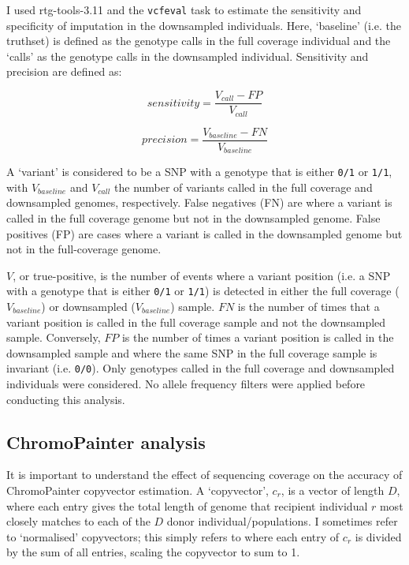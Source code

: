 {I used rtg-tools-3.11 \cite{cleary2014joint} and the \texttt{vcfeval} task to estimate the sensitivity and specificity of imputation in the downsampled individuals. Here, `baseline' (i.e. the truthset) is defined as the genotype calls in the full coverage individual and the `calls' as the genotype calls in the downsampled individual. Sensitivity and precision are defined as: 

\begin{equation}
sensitivity = \frac{V_{call}-FP}{V_{call}}
\end{equation}

\begin{equation}
precision = \frac{V_{baseline}-FN}{V_{baseline}}
\end{equation}

A `variant' is considered to be a SNP with a genotype that is either \texttt{0/1} or \texttt{1/1}, with $V_{baseline}$ and $V_{call}$ the number of variants called in the full coverage and downsampled genomes, respectively. False negatives (FN) are where a variant is called in the full coverage genome but not in the downsampled genome. False positives (FP) are cases where a variant is called in the downsampled genome but not in the full-coverage genome.

$V$, or true-positive, is the number of events where a variant position (i.e. a SNP with a genotype that is either \texttt{0/1} or \texttt{1/1}) is detected in either the full coverage ($V_{baseline}$) or downsampled ($V_{baseline}$) sample. $FN$ is the number of times that a variant position is called in the full coverage sample and not the downsampled sample. Conversely, $FP$ is the number of times a variant position is called in the downsampled sample and where the same SNP in the full coverage sample is invariant (i.e. \texttt{0/0}). Only genotypes called in the full coverage and downsampled individuals were considered. No allele frequency filters were applied before conducting this analysis.

\subsection{ChromoPainter analysis} \label{ChromoPainter_analysis}

It is important to understand the effect of sequencing coverage on the accuracy of ChromoPainter copyvector estimation. A `copyvector', $c_{r}$, is a vector of length $D$, where each entry gives the total length of genome that recipient individual $r$ most closely matches to each of the $D$ donor individual/populations. I sometimes refer to `normalised' copyvectors; this simply refers to where each entry of $c_r$ is divided by the sum of all entries, scaling the copyvector to sum to 1. 

}
